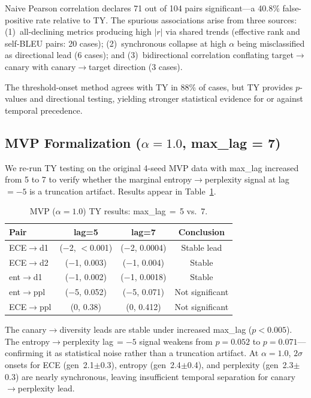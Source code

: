 \documentclass[letterpaper,11pt]{article}
\begin{document}
Naive Pearson correlation declares 71 out of 104 pairs significant---a 40.8\% false-positive rate relative to TY. The spurious associations arise from three sources: (1)~all-declining metrics producing high $|r|$ via shared trends (effective rank and self-BLEU pairs: 20 cases); (2)~synchronous collapse at high $\alpha$ being misclassified as directional lead (6 cases); and (3)~bidirectional correlation conflating target$\to$canary with canary$\to$target direction (3 cases).

The threshold-onset method agrees with TY in 88\% of cases, but TY provides $p$-values and directional testing, yielding stronger statistical evidence for or against temporal precedence.

\subsection{MVP Formalization ($\alpha = 1.0$, max\_lag = 7)}
\label{sec:mvp}

We re-run TY testing on the original 4-seed MVP data with max\_lag increased from 5 to 7 to verify whether the marginal entropy$\to$perplexity signal at lag~$= -5$ is a truncation artifact. Results appear in Table~\ref{tab:mvp_maxlag}.

\begin{table}[t]
\centering
\caption{MVP ($\alpha\!=\!1.0$) TY results: max\_lag$\,=\,$5 vs.\ 7.}
\label{tab:mvp_maxlag}
\small
\begin{tabular}{@{}lccc@{}}
\toprule
Pair & lag=5 & lag=7 & Conclusion \\
\midrule
ECE$\to$d1       & ($-$2, $<$0.001) & ($-$2, 0.0004) & Stable lead \\
ECE$\to$d2       & ($-$1, 0.003) & ($-$1, 0.004) & Stable \\
ent$\to$d1       & ($-$1, 0.002) & ($-$1, 0.0018) & Stable \\
ent$\to$ppl      & ($-$5, 0.052) & ($-$5, 0.071) & Not significant \\
ECE$\to$ppl      & (0, 0.38) & (0, 0.412)    & Not significant \\
\bottomrule
\end{tabular}
\end{table}

The canary$\to$diversity leads are stable under increased max\_lag ($p < 0.005$). The entropy$\to$perplexity lag$\,= -5$ signal weakens from $p = 0.052$ to $p = 0.071$---confirming it as statistical noise rather than a truncation artifact. At $\alpha = 1.0$, $2\sigma$ onsets for ECE (gen~2.1$\pm$0.3), entropy (gen~2.4$\pm$0.4), and perplexity (gen~2.3$\pm$0.3) are nearly synchronous, leaving insufficient temporal separation for canary$\to$perplexity lead.
\end{document}
